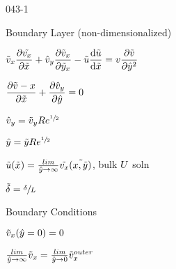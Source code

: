 \begin{mitframe}{043-1}
\begin{listone}
		\item Boundary Layer (non-dimensionalized)
			
            \begin{listtwo}
            \item $\tilde{\vvel}_{\disp}\dfrac{\partial\tilde{\vvel_{\disp}}}{\partial\tilde{\disp}}+\hat{\vvel}_y\dfrac{\partial\tilde{\vvel}_{\disp}}{\partial\tilde{y}_{\disp}}-\tilde{\forcepot}\dfrac{\mathrm{d}\tilde{\forcepot}}{\mathrm{d}\tilde{\disp}}=\vvel\dfrac{\partial\tilde{\vvel}}{\partial\hat{y}^2}$
            \item $\dfrac{\partial\tilde{\vvel}-{\disp}}{\partial\tilde{\disp}}+\dfrac{\partial\hat{\vvel}_{y}}{\partial\hat{y}}=0$
            
            		\begin{listthree}
                    		\item $\hat{\vvel}_y=\tilde{\vvel}_y\reynolds^{\sfrac{1}{2}}$
                            \item $\hat{y}=\tilde{y}\reynolds^{\sfrac{1}{2}}$
                            \item $\tilde{\forcepot}(\tilde{\disp})=\frac{lim}{\hat{y}\rightarrow\infty}\tilde{\vvel_{\disp}}(\tilde{\disp, \tilde{y}})$, bulk $\uvel$ soln
                                               
                    \end{listthree}
            \item $\tilde{\blthick}=\sfrac{\blthick}{\length}$
                        \end{listtwo}
\item Boundary Conditions
		\begin{listtwo}
        		\item $\tilde{\vvel}_{\disp}(\hat{y}=0)=0$
                \item $\frac{lim}{\hat{y}\rightarrow\infty}\tilde{\vvel}_{\disp}=\frac{lim}{\hat{y}\rightarrow{0}}\tilde{\vvel}_{\disp}^{outer}$
                      

\end{listtwo}
\end{listone}
\end{mitframe}
